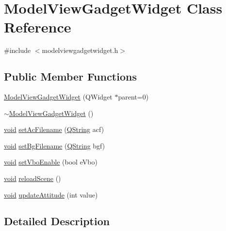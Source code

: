 \hypertarget{class_model_view_gadget_widget}{\section{\-Model\-View\-Gadget\-Widget \-Class \-Reference}
\label{class_model_view_gadget_widget}
}


{\ttfamily \#include $<$modelviewgadgetwidget.\-h$>$}

\subsection*{\-Public \-Member \-Functions}
\begin{DoxyCompactItemize}
\item 
\hyperlink{group___model_view_plugin_ga7b299b7e0c58f0bca02228b6376370a6}{\-Model\-View\-Gadget\-Widget} (\-Q\-Widget $\ast$parent=0)
\item 
\hyperlink{group___model_view_plugin_gafd8359344ca9b61a21a93e1256e9247a}{$\sim$\-Model\-View\-Gadget\-Widget} ()
\item 
\hyperlink{group___u_a_v_objects_plugin_ga444cf2ff3f0ecbe028adce838d373f5c}{void} \hyperlink{group___model_view_plugin_ga61a44ab1922172cfaee66b78fde29538}{set\-Ac\-Filename} (\hyperlink{group___u_a_v_objects_plugin_gab9d252f49c333c94a72f97ce3105a32d}{\-Q\-String} acf)
\item 
\hyperlink{group___u_a_v_objects_plugin_ga444cf2ff3f0ecbe028adce838d373f5c}{void} \hyperlink{group___model_view_plugin_gab29343cadc70576f4b7d8f91dd1a3863}{set\-Bg\-Filename} (\hyperlink{group___u_a_v_objects_plugin_gab9d252f49c333c94a72f97ce3105a32d}{\-Q\-String} bgf)
\item 
\hyperlink{group___u_a_v_objects_plugin_ga444cf2ff3f0ecbe028adce838d373f5c}{void} \hyperlink{group___model_view_plugin_ga9ae7a41d63686c2ec25ee02e08ffed21}{set\-Vbo\-Enable} (bool e\-Vbo)
\item 
\hyperlink{group___u_a_v_objects_plugin_ga444cf2ff3f0ecbe028adce838d373f5c}{void} \hyperlink{group___model_view_plugin_gad031b977be54f4bd5243fa4d6f846f68}{reload\-Scene} ()
\item 
\hyperlink{group___u_a_v_objects_plugin_ga444cf2ff3f0ecbe028adce838d373f5c}{void} \hyperlink{group___model_view_plugin_gaa7c16fd0b59ded87f8d136fd72680dca}{update\-Attitude} (int value)
\end{DoxyCompactItemize}


\subsection{\-Detailed \-Description}


